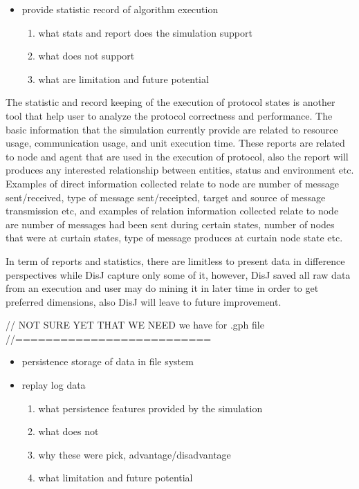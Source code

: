 \begin{itemize}
\item provide statistic record of algorithm execution
    \begin{enumerate}
    \item what stats and report does the simulation support
    \item what does not support
    \item what are limitation and future potential
    \end{enumerate}
\end{itemize}

The statistic and record keeping of the execution of protocol states is another tool that help user to analyze the protocol correctness and performance. The basic information that the simulation currently provide are related to resource usage, communication usage, and unit execution time. These reports are related to node and agent that are used in the execution of protocol, also the report will produces any interested relationship between entities, status and environment etc. Examples of direct information collected relate to node are number of message sent/received, type of message sent/receipted, target and source of message transmission etc, and examples of relation information collected relate to node are number of messages had been sent during certain states, number of nodes that were at curtain states, type of message produces at curtain node state etc.

In term of reports and statistics, there are limitless to present data in difference perspectives while DisJ capture only some of it, however, DisJ saved all raw data from an execution and user may do mining it in later time in order to get preferred dimensions, also DisJ will leave to future improvement.

// NOT SURE YET THAT WE NEED we have for .gph file
//==========================
\begin{itemize}
\item persistence storage of data in file system
\item replay log data
    \begin{enumerate}
    \item what persistence features provided by the simulation
    \item what does not
    \item why these were pick, advantage/disadvantage
    \item what limitation and future potential
    \end{enumerate}
\end{itemize}

